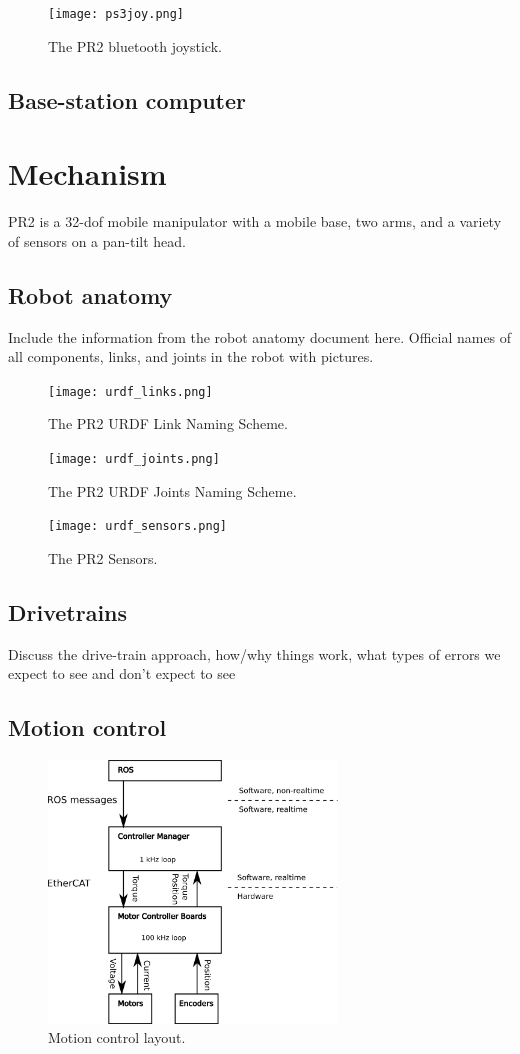 \begin{figure}[h]
\centering
\texttt{[image: ps3joy.png]}
\caption{The PR2 bluetooth joystick.}
\label{fig:ps3joy}
\end{figure}

\subsection{Base-station computer}
\section{Mechanism}
PR2 is a 32-dof mobile manipulator with a mobile base, two arms, and a variety of sensors on a pan-tilt head.
\subsection{Robot anatomy}
Include the information from the robot anatomy document here.  Official names of all components, links, and 
joints in the robot with pictures.

\begin{figure}[!h]
\centering
\texttt{[image: urdf\_links.png]}
\caption{The PR2 URDF Link Naming Scheme.}
\label{fig:urdf_link_names}
\texttt{[image: urdf\_joints.png]}
\caption{The PR2 URDF Joints Naming Scheme.}
\label{fig:urdf_joints}
\texttt{[image: urdf\_sensors.png]}
\caption{The PR2 Sensors.}
\label{fig:urdf_sensor}
\end{figure}

\subsection{Drivetrains}
Discuss the drive-train approach, how/why things work, what types of errors we expect to see and don't expect to see

\subsection{Motion control}


\begin{figure}[h]
\centering
\includegraphics[width=290px]{images/mechanism_control.png}
\caption{Motion control layout.}
\label{fig:motion_control}
\end{figure}


